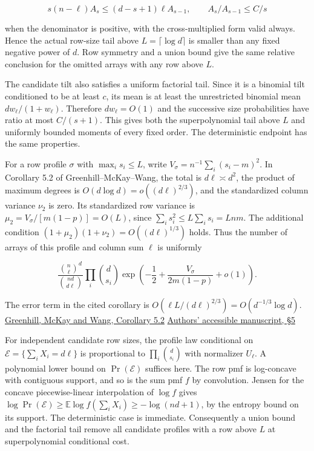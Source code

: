 \begin{equation*}
s(n-\ell)A_s\le (d-s+1)\ell A_{s-1},\qquad
A_s/A_{s-1}\le C/s
\end{equation*}

when the denominator is positive, with the cross-multiplied form valid always. Hence the actual row-size tail above $L=\lceil\log d\rceil$ is smaller than any fixed negative power of $d$. Row symmetry and a union bound give the same relative conclusion for the omitted arrays with any row above $L$.

The candidate tilt also satisfies a uniform factorial tail. Since it is a binomial tilt conditioned to be at least $c$, its mean is at least the unrestricted binomial mean $d w_\ell/(1+w_\ell)$. Therefore $d w_\ell=O(1)$ and the successive size probabilities have ratio at most $C/(s+1)$. This gives both the superpolynomial tail above $L$ and uniformly bounded moments of every fixed order. The deterministic endpoint has the same properties.

For a row profile $\sigma$ with $\max_i s_i\le L$, write $V_{\sigma}=n^{-1}\sum_i(s_i-m)^2$. In Corollary 5.2 of Greenhill--McKay--Wang, the total is $d\ell\asymp d^2$, the product of maximum degrees is $O(d\log d)=o((d\ell)^{2/3})$, and the standardized column variance $\nu_2$ is zero. Its standardized row variance is $\mu_2=V_{\sigma}/[m(1-p)]=O(L)$, since $\sum_i s_i^2\le L\sum_i s_i=Lnm$. The additional condition $(1+\mu_2)(1+\nu_2)=O((d\ell)^{1/3})$ holds. Thus the number of arrays of this profile and column sum $\ell$ is uniformly

\begin{equation}
\frac{\binom n\ell^d}{\binom{nd}{d\ell}}\prod_i\binom d{s_i}
\exp\left(-\frac12+\frac{V_{\sigma}}{2m(1-p)}+o(1)\right).
\tag{S1}
\end{equation}

The error term in the cited corollary is $O(\ell L/(d\ell)^{2/3})=O(d^{-1/3}\log d)$. \href{https://doi.org/10.1016/j.jcta.2005.03.005}{Greenhill, McKay and Wang, Corollary 5.2} \enspace \href{https://users.cecs.anu.edu.au/~bdm/papers/irregular.pdf}{Authors' accessible manuscript, §5}

For independent candidate row sizes, the profile law conditional on $\mathcal E=\{\sum_i X_i=d\ell\}$ is proportional to $\prod_i\binom d{s_i}$ with normalizer $U_\ell$. A polynomial lower bound on $\Pr(\mathcal E)$ suffices here. The row pmf is log-concave with contiguous support, and so is the sum pmf $f$ by convolution. Jensen for the concave piecewise-linear interpolation of $\log f$ gives $\log\Pr(\mathcal E)\ge\mathbb E\log f(\sum_iX_i)\ge-\log(nd+1)$, by the entropy bound on its support. The deterministic case is immediate. Consequently a union bound and the factorial tail remove all candidate profiles with a row above $L$ at superpolynomial conditional cost.

